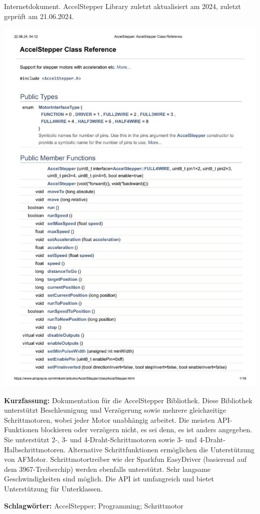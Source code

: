 {
	Internetdokument. AccelStepper Library
	zuletzt aktualisiert am 2024, zuletzt geprüft am 21.06.2024.
	\\
	\begin{minipage}{0.38\textwidth}
		\includegraphics[width=\linewidth]{images/McCauley.jpg}
	\end{minipage}
	\hfill
	\begin{minipage}{0.6\textwidth}
		\textbf{Kurzfassung:}
	Dokumentation für die AccelStepper Bibliothek. Diese Bibliothek unterstützt Beschleunigung und Verzögerung sowie mehrere gleichzeitige Schrittmotoren, wobei jeder Motor unabhängig arbeitet. Die meisten API-Funktionen blockieren oder verzögern nicht, es sei denn, es ist anders angegeben. Sie unterstützt 2-, 3- und 4-Draht-Schrittmotoren sowie 3- und 4-Draht-Halbschrittmotoren. Alternative Schrittfunktionen ermöglichen die Unterstützung von AFMotor. Schrittmotortreiber wie der Sparkfun EasyDriver (basierend auf dem 3967-Treiberchip) werden ebenfalls unterstützt. Sehr langsame Geschwindigkeiten sind möglich. Die API ist umfangreich und bietet Unterstützung für Unterklassen.
	\end{minipage}
	\textbf{Schlagwörter:}
	AccelStepper; Programming; Schrittmotor
}

